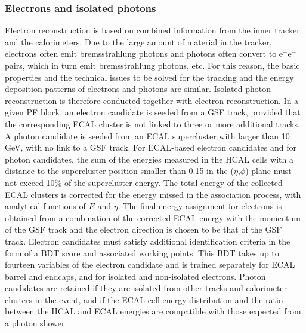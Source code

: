 \subsubsection{Electrons and isolated photons} Electron reconstruction is based on combined information from the inner tracker and the calorimeters. Due to the large amount of material in the tracker, electrons often emit bremsstrahlung photons and photons often convert to e$^+$e$^-$ pairs, which in turn emit bremsstrahlung photons, etc.  For this reason, the basic properties and the technical issues to be solved for the tracking and the energy deposition patterns of electrons and photons are similar. Isolated photon reconstruction is therefore conducted together with electron reconstruction. In a given PF block, an electron candidate is seeded from a GSF track, provided that the corresponding ECAL cluster is not linked to three or more additional tracks. A photon candidate is seeded from an ECAL supercluster with \et larger than 10 GeV, with no link to a GSF track. For ECAL-based electron candidates and for photon candidates, the sum of the energies measured in the HCAL cells with a distance to the supercluster position smaller than 0.15 in the ($\eta$,$\phi$) plane must not exceed 10$\%$ of the supercluster energy. The total energy of the collected ECAL clusters is corrected for the energy missed in the association process, with analytical functions of $E$ and $\eta$. The final energy assignment for electrons is obtained from a combination of the corrected ECAL energy with the momentum of the GSF track and the electron direction is chosen to be that of the GSF track. Electron candidates must satisfy additional identification criteria in the form of a BDT score and associated working points. This BDT takes up to fourteen variables of the electron candidate and is trained separately for ECAL barrel and endcaps, and for isolated and non-isolated electrons. Photon candidates are retained if they are isolated from other tracks and calorimeter clusters in the event, and if the ECAL cell energy distribution and the ratio between the HCAL and ECAL energies are compatible with those expected from a photon shower. 

